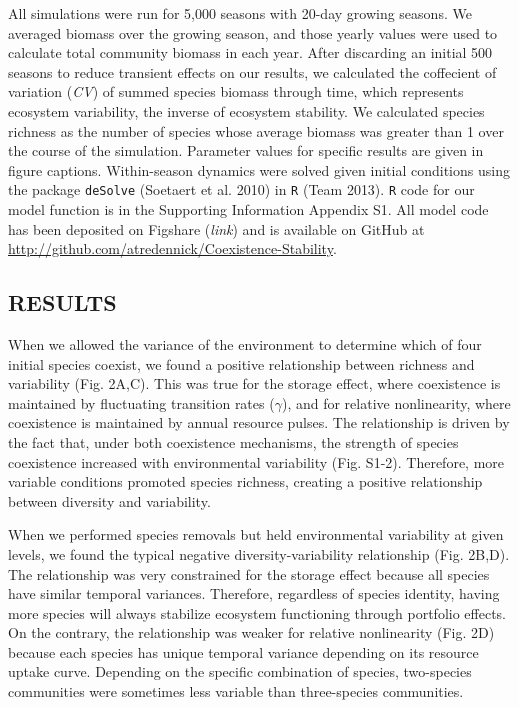 \documentclass[12pt,]{article}
\begin{document}
All simulations were run for 5,000 seasons with 20-day growing seasons.
We averaged biomass over the growing season, and those yearly values
were used to calculate total community biomass in each year. After
discarding an initial 500 seasons to reduce transient effects on our
results, we calculated the coffecient of variation (\emph{CV}) of summed
species biomass through time, which represents ecosystem variability,
the inverse of ecosystem stability. We calculated species richness as
the number of species whose average biomass was greater than 1 over the
course of the simulation. Parameter values for specific results are
given in figure captions. Within-season dynamics were solved given
initial conditions using the package \texttt{deSolve} (Soetaert et al.
2010) in \texttt{R} (Team 2013). \texttt{R} code for our model function
is in the Supporting Information Appendix S1. All model code has been
deposited on Figshare (\emph{link}) and is available on GitHub at
\url{http://github.com/atredennick/Coexistence-Stability}.

\subsection{RESULTS}\label{results}

When we allowed the variance of the environment to determine which of
four initial species coexist, we found a positive relationship between
richness and variability (Fig. 2A,C). This was true for the storage
effect, where coexistence is maintained by fluctuating transition rates
(\(\gamma\)), and for relative nonlinearity, where coexistence is
maintained by annual resource pulses. The relationship is driven by the
fact that, under both coexistence mechanisms, the strength of species
coexistence increased with environmental variability (Fig. S1-2).
Therefore, more variable conditions promoted species richness, creating
a positive relationship between diversity and variability.

When we performed species removals but held environmental variability at
given levels, we found the typical negative diversity-variability
relationship (Fig. 2B,D). The relationship was very constrained for the
storage effect because all species have similar temporal variances.
Therefore, regardless of species identity, having more species will
always stabilize ecosystem functioning through portfolio effects. On the
contrary, the relationship was weaker for relative nonlinearity (Fig.
2D) because each species has unique temporal variance depending on its
resource uptake curve. Depending on the specific combination of species,
two-species communities were sometimes less variable than three-species
communities.
\end{document}
